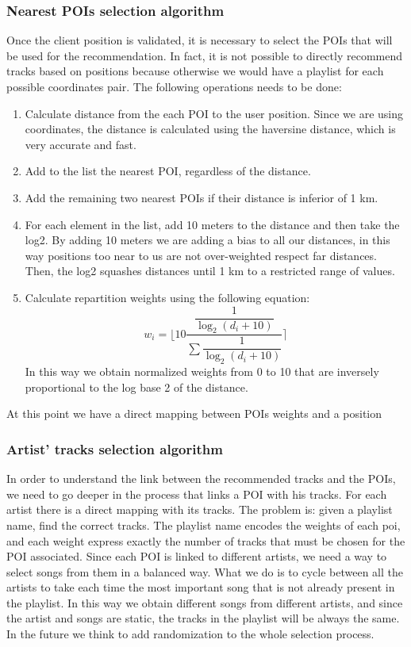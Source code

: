 \documentclass[paper=a4, fontsize=11pt]{scrartcl}
\begin{document}
\subsubsection{Nearest POIs selection algorithm}
Once the client position is validated, it is necessary to select the POIs that will be used for the recommendation. In fact, it is not possible to directly recommend tracks based on positions because otherwise we would have a playlist for each possible coordinates pair. The following operations needs to be done:
\begin{enumerate}
\item Calculate distance from the each POI to the user position. Since we are using coordinates, the distance is calculated using the haversine distance, which is very accurate and fast.
\item Add to the list the nearest POI, regardless of the distance.
\item Add the remaining two nearest POIs if their distance is inferior of 1 km.
\item For each element in the list, add 10 meters to the distance and then take the log2. By adding 10 meters we are adding a bias to all our distances, in this way positions too near to us are not over-weighted respect far distances. Then, the log2 squashes distances until 1 km to a restricted range of values.
\item Calculate repartition weights using the following equation:
$$w_i = \Bigg \lfloor 10 \dfrac{\dfrac{1}{\log_2 (d_i + 10)}}{\sum \dfrac{1}{\log_2 (d_i + 10)} } \Bigg \rceil$$
In this way we obtain normalized weights from 0 to 10 that are inversely proportional to the log base 2 of the distance. 
\end{enumerate}
At this point we have a direct mapping between POIs weights and a position

\subsubsection{Artist' tracks selection algorithm}
In order to understand the link between the recommended tracks and the POIs, we need to go deeper in the process that links a POI with his tracks.
For each artist there is a direct mapping with its tracks.
The problem is: given a playlist name, find the correct tracks.
The playlist name encodes the weights of each poi, and each weight express exactly the number of tracks that must be chosen for the POI associated.
Since each POI is linked to different artists, we need a way to select songs from them in a balanced way.
What we do is to cycle between all the artists to take each time the most important song that is not already present in the playlist. In this way we obtain different songs from different artists, and since the artist and songs are static, the tracks in the playlist will be always the same. In the future we think to add randomization to the whole selection process.
\end{document}
